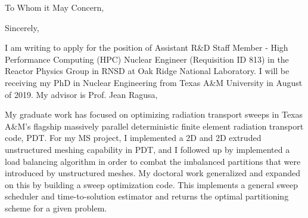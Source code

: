 \documentclass[11pt,letterpaper,roman]{moderncv}        %
\begin{document}
\date{\today}
\opening{To Whom it May Concern,}
\closing{Sincerely,}

\makelettertitle

I am writing to apply for the position of Assistant R\&D Staff Member - High Performance Computing (HPC) Nuclear Engineer (Requisition ID 813) in the Reactor Physics Group in RNSD at Oak Ridge National Laboratory. I will be receiving my PhD in Nuclear Engineering from Texas A\&M University in August of 2019. My advisor is Prof. Jean Ragusa, %

My graduate work has focused on optimizing radiation transport sweeps in Texas A\&M's flagship massively parallel deterministic finite element radiation transport code, PDT. For my MS project, I implemented a 2D and 2D extruded unstructured meshing capability in PDT, and I followed up by implemented a load balancing algorithm in order to combat the imbalanced partitions that were introduced by unstructured meshes. My doctoral work generalized and expanded on this by building a sweep optimization code. This implements a general sweep scheduler and time-to-solution estimator and returns the optimal partitioning scheme for a given problem. %


\end{document}

